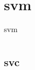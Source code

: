 \chapter{svm\label{svm}}
\begin{table}
    \centering
    \caption{svm}
    \begin{tabular}{ll}
        \hline
        \nameref{svc} & \\
        \hline
    \end{tabular}
\end{table}
\section{svc\label{svc}}